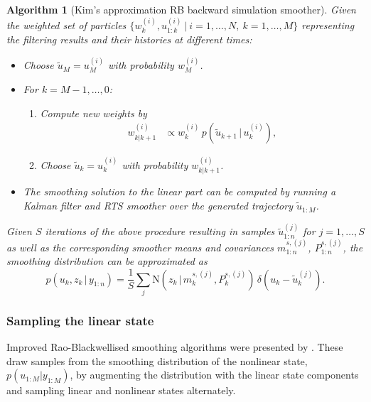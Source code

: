 \documentclass[twocolumn]{autart}    %
\newtheorem{algo}{Algorithm}[section]
\begin{document}
\begin{algo}[Kim's approximation RB backward simulation smoother]
  \label{alg:rbbssmooth}
  Given the weighted set of particles $\{ w_k^{(i)}, u_{1:k}^{(i)} ~|~
  i=1,\ldots,N,~k=1,\ldots,M \}$ representing the filtering results
  and their histories at different times:
\begin{itemize}
\item Choose $\tilde{u}_M = u_M^{(i)}$ with probability $w^{(i)}_{M}$.
\item For $k=M-1,\ldots,0$:
\begin{enumerate}
  \item Compute new weights by
    \begin{equation}
      \begin{split}
        w^{(i)}_{k|k+1} &\propto
        w_k^{(i)} \,
        p(\tilde{u}_{k+1}\,|\,u_{k}^{(i)}),
     \end{split}
    \end{equation}

  \item Choose $\tilde{u}_k = u_k^{(i)}$ with probability
    $w^{(i)}_{k|k+1}$.
  \end{enumerate}
\item The smoothing solution to the linear part can be computed by running a Kalman filter and RTS smoother over the generated trajectory $\tilde{u}_{1:M}$.
\end{itemize}
%
Given $S$ iterations of the above procedure resulting in samples $\tilde{u}_{1:n}^{(j)}$ for $j=1,\ldots,S$ as well as the corresponding smoother means and covariances $m^{s,(j)}_{1:n}$, $P^{s,(j)}_{1:n}$, the smoothing distribution can be approximated as
%
\begin{equation}
  p(u_k,z_k\,|\,y_{1:n})
  = \frac{1}{S} \sum_j \mathrm{N}(z_k\,|\,m_k^{s,(j)},P_k^{s,(j)}) \,
  \delta(u_k - \tilde{u}_k^{(j)}).
\nonumber
\end{equation}
\end{algo}


\subsubsection{Sampling the linear state}
%
Improved Rao-Blackwellised smoothing algorithms were presented by \cite{Fong+Godsill+Doucet+West:2002,Lindsten+Schon:2011}. These draw samples from the smoothing distribution of the nonlinear state, $p(u_{1:M} | y_{1:M})$, by augmenting the distribution with the linear state components and sampling linear and nonlinear states alternately.
\end{document}
